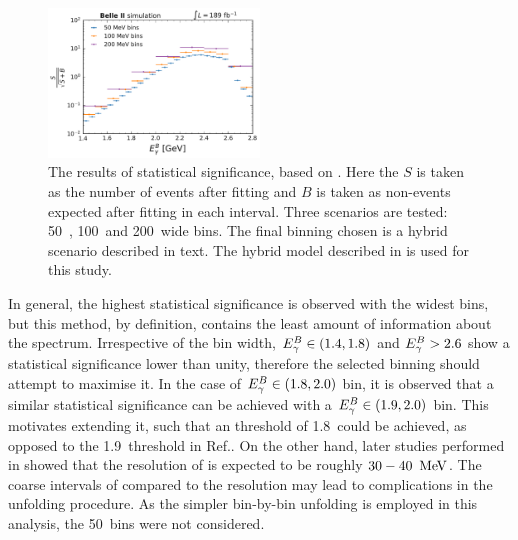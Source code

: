 \begin{figure}[htbp!]
    \centering
    \includegraphics[width=0.5\textwidth]{figures/fitting/binning_significance.pdf}
    \caption{\label{fig:binning_significance}The results of statistical significance, based on .
    Here the $S$ is taken as the number of \BtoXsgamma events after fitting and $B$ is taken as non-\BtoXsgamma events expected after fitting in each \EB interval.
    Three scenarios are tested: 50~\mev, 100~\mev and 200~\mev wide bins.
    The final binning chosen is a hybrid scenario described in  text.
    The hybrid model described in  is used for this study.
    }    
\end{figure}

In general, the highest statistical significance is observed with the widest bins, but this method, by definition, contains the least amount of information about the spectrum.
Irrespective of the bin width,  ${E^B_{\gamma}}\in(1.4,1.8)$ and ${E^B_{\gamma}}>2.6$ show a statistical significance lower than unity, therefore the selected binning should attempt to maximise it.
In the case of ${E^B_{\gamma}}\in(1.8,2.0)$ bin, it is observed that a similar statistical significance can be achieved with a ${E^B_{\gamma}}\in(1.9,2.0)$ bin.
This motivates extending it, such that an \EB threshold of 1.8~\gev could be achieved, as opposed to the 1.9~\gev threshold in Ref.\cite{BaBar:2007yhb}.
On the other hand, later studies performed in  showed that the resolution of \EB is expected to be roughly $30-40~\mathrm{\,Me\kern -0.1em V}$.
The coarse intervals of \EB compared to the resolution may lead to complications in the unfolding procedure.
As the simpler bin-by-bin unfolding is employed in this analysis, the 50~\mev bins were not considered.


